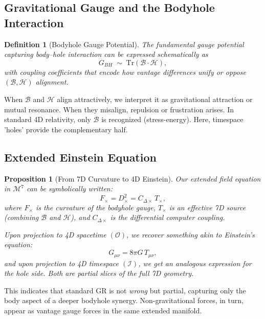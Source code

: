 \documentclass{article}
\newtheorem{definition}{Definition}
\newtheorem{proposition}{Proposition}
\begin{document}
\subsection*{Gravitational Gauge and the Bodyhole Interaction}

\begin{definition}[Bodyhole Gauge Potential]
The fundamental gauge potential capturing body--hole interaction can be expressed schematically as
\begin{equation}
G_{BH} \;\sim\; \mathrm{Tr}(\mathcal{B}\cdot\mathcal{H}),
\end{equation}
with coupling coefficients that encode how vantage differences unify or oppose $(\mathcal{B},\mathcal{H})$ alignment.
\end{definition}

When $\mathcal{B}$ and $\mathcal{H}$ align attractively, we interpret it as gravitational attraction or mutual resonance. When they misalign, repulsion or frustration arises. In standard 4D relativity, only $\mathcal{B}$ is recognized (stress-energy). Here, timespace 'holes' provide the complementary half.

\subsection*{Extended Einstein Equation}

\begin{proposition}[From 7D Curvature to 4D Einstein]
Our extended field equation in $\mathcal{M}^7$ can be symbolically written:
\begin{equation}
F_{\times} = D^2_{\times} = C_{\Delta\times}\, T_{\times},
\end{equation}
where $F_{\times}$ is the curvature of the bodyhole gauge, $T_{\times}$ is an effective 7D source (combining $\mathcal{B}$ and $\mathcal{H}$), and $C_{\Delta\times}$ is the differential computer coupling.

Upon projection to 4D spacetime $(\mathcal{O})$, we recover something akin to Einstein's equation:
\begin{equation}
G_{\mu\nu} = 8\pi G\, T_{\mu\nu},
\end{equation}
and upon projection to 4D timespace $(\mathcal{I})$, we get an analogous expression for the hole side. Both are partial slices of the full 7D geometry.
\end{proposition}

This indicates that standard GR is not \emph{wrong} but partial, capturing only the body aspect of a deeper bodyhole synergy. Non-gravitational forces, in turn, appear as vantage gauge forces in the same extended manifold.
\end{document}
